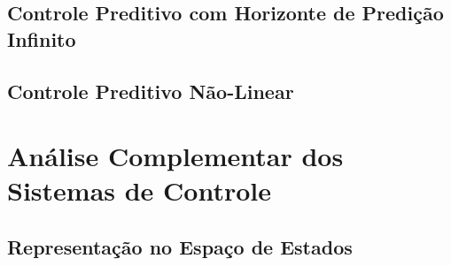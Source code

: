 
\subsection{Controle Preditivo com Horizonte de Predição Infinito}
\label{subsec:controle_preditivo_com_horizonte_preditivo_infinito}


\subsection{Controle Preditivo Não-Linear}
\label{subsec:controle_preditivo_nao_linear}


\section{Análise Complementar dos Sistemas de Controle}
\label{sec:analise_complementar_dos_sistemas_de_controle}


\subsection{Representação no Espaço de Estados}
\label{subsec:representacao_no_espaco_de_estados}

